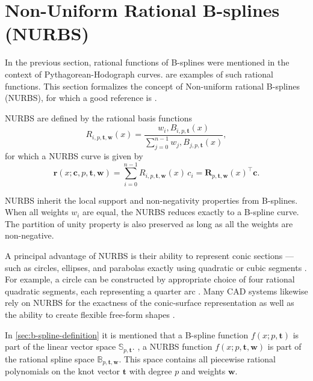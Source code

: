 \section{Non-Uniform Rational B-splines (NURBS)}
In the previous section, rational functions of B-splines were mentioned in the context of Pythagorean-Hodograph curves.  are examples of such rational functions. This section formalizes the concept of Non-uniform rational B-splines (NURBS), for which a good reference is \cite{Piegl1997}. 

NURBS are defined by the rational basis functions
\begin{equation}\label{eq:nurbs-basis}
R_{i,p,\mathbf t, \mathbf w}(x)  = \frac{w_i,B_{i,p,\mathbf t}(x)}{\sum_{j=0}^{n-1}w_j,B_{j,p,\mathbf t}(x)},
\end{equation}
for which a NURBS curve is given by
\begin{equation}\label{eq:nurbs-curve}
\mathbf r(x; \mathbf c, p, \mathbf t, \mathbf w)  = \sum_{i=0}^{n-1}R_{i,p,\mathbf t, \mathbf w}(x)\,c_i
= \mathbf R_{p,\mathbf t, \mathbf w}(x)^\top \mathbf c.
\end{equation}

NURBS inherit the local support and non-negativity properties from B-splines. When all weights $w_i$ are equal, the NURBS reduces exactly to a B-spline curve. The partition of unity property is also preserved as long as all the weights are non-negative. \citep{Piegl1997}

A principal advantage of NURBS is their ability to represent conic sections — such as circles, ellipses, and parabolas exactly using quadratic or cubic segments \citep{Piegl1997}. For example, a circle can be constructed by appropriate choice of four rational quadratic segments, each representing a quarter arc \citep{DenbighStarkeyNURBS}. Many CAD systems likewise rely on NURBS for the exactness of the conic-surface representation as well as the ability to create flexible free-form shapes \citep{Farin1991,PieglTillerSIGGRAPH,cottrell2009isogeometric}.

In \cref{sec:b-spline-definition} it is mentioned that a B-spline function $f(x; p, \mathbf t)$ is part of the linear vector space $\mathbb S_{p, \mathbf t}$.
, a NURBS function $f(x; p, \mathbf t, \mathbf w)$ is part of the rational spline space $\mathbb B_{p, \mathbf t, \mathbf w}$. This space contains all piecewise rational polynomials on the knot vector $\mathbf t$ with degree $p$ and weights $\mathbf w$. 

